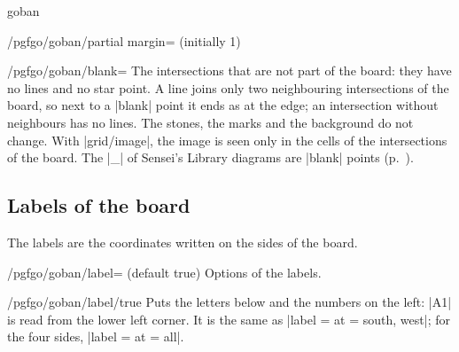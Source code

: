 \begin{environment}{{goban}}
\begin{key}{/pgfgo/goban/partial margin= (initially 1)}
		\begin{codeexample}[]
			\begin{goban}[19, partial = auto]
			\end{goban}

			\begin{goban}[19, partial = auto, partial margin = 0]
			\end{goban}
		\end{codeexample}
	\end{key}

	\begin{key}{/pgfgo/goban/blank=}
		The intersections that are not part of the board: they have no lines and no star point. A line joins only two neighbouring intersections of the board, so next to a |blank| point it ends as at the edge; an intersection without neighbours has no lines. The stones, the marks and the background do not change. With |grid/image|, the image is seen only in the cells of the intersections of the board. The |_| of Sensei's Library diagrams are |blank| points (p.~\pageref{subsec:sgfsensei}).

		\begin{codeexample}[]
			\begin{goban}[9, blank = E]
			\end{goban}

			\begin{goban}[9, blank = {A9:C7, 5}]
			\end{goban}
		\end{codeexample}
	\end{key}

	\subsection{Labels of the board}\label{subsec:etiquetas}

	The labels are the coordinates written on the sides of the board.

	\begin{key}{/pgfgo/goban/label= (default true)}
		Options of the labels.
	\end{key}

	\begin{key}{/pgfgo/goban/label/true}
		Puts the letters below and the numbers on the left: |A1| is read from the lower left corner. It is the same as |label = {at = {south, west}}|; for the four sides, |label = {at = all}|.


\end{key}
\end{environment}
